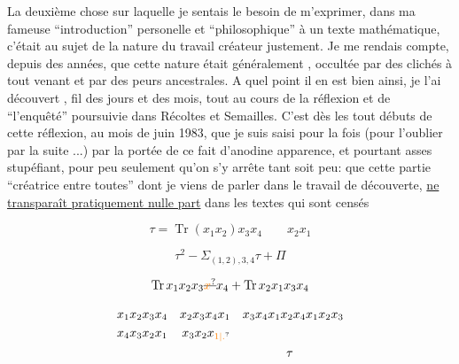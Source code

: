 La deuxième chose sur laquelle je sentais le besoin de m'exprimer, dans ma fameuse ``introduction''  personelle et ``philosophique'' à un texte mathématique, c'était au sujet de la nature du travail créateur justement. Je me rendais compte, depuis des années, que cette nature était généralement , occultée par des clichés à tout venant et par des peurs ancestrales. A quel point il en est bien ainsi, je l'ai découvert ,  fil des jours et des mois, tout au cours de la réflexion et de ``l'enquêté'' poursuivie dans Récoltes et Semailles. C'est dès les tout débuts de cette réflexion, au mois de juin 1983, que je suis saisi pour la  fois (pour l'oublier  par la suite ...) par la portée de ce fait d'anodine apparence, et pourtant asses stupéfiant, pour peu seulement qu'on s'y arrête tant soit peu: que cette partie ``créatrice entre toutes'' dont je viens de parler dans le travail de découverte, \uline{ne transparaît pratiquement nulle part} dans les textes qui sont censés

\[
 \tau=\operatorname{Tr}(x_1x_2)x_3x_4\qquad x_2x_1
\]



\[
 \tau^2-\Sigma_{(1,2),3,4}\tau+\Pi
\]

\[
 \operatorname{Tr}x_1x_2x_3\deleted{\unsure{x}}x_4+\operatorname{Tr}x_2x_1x_3x_4
\]

\[
 \begin{aligned}
 &x_1x_2x_3x_4 &x_2x_3x_4x_1&&x_3x_4x_1x_2 &x_4x_1x_2x_3\\
 &x_4x_3x_2x_1 &x_3x_2x_{\unsure{1|.}}\\
 &&&&\tau
 \end{aligned}
\]


